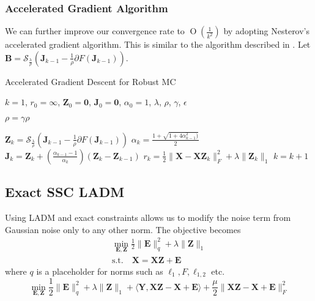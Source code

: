 \documentclass{article}
\newcommand{\BigO}[1]{\ensuremath{\operatorname{O}\left(#1\right)}}
\begin{document}
\subsubsection{Accelerated Gradient Algorithm}

We can further improve our convergence rate to $\BigO{\frac{1}{k^2}}$ by adopting Nesterov's accelerated gradient algorithm. This is similar to the algorithm described in \cite{ji2009accelerated}. Let $\mathbf B = \mathcal S_{\frac{\lambda}{\rho}}(\mathbf J_{k-1} - \frac1{\rho}\partial F(\mathbf J_{k-1}))$.

\begin{algorithm}
\caption{Accelerated Gradient Descent for Robust MC}
\begin{algorithmic}

\REQUIRE $k = 1$, $r_0 = \infty$, $\mathbf Z_0 = \mathbf 0$,  $\mathbf J_0 = \mathbf 0$, $\alpha_0 = 1$, $\lambda$, $\rho$, $\gamma$, $\epsilon$


	
		\STATE $\rho = \gamma \rho$	
	
	\ENDWHILE

	\STATE $\mathbf Z_k = \mathcal S_{\frac{\lambda}{\rho}}(\mathbf J_{k-1} - \frac1{\rho}\partial F(\mathbf J_{k-1}))$
	\STATE $\alpha_{k} = \frac{1 + \sqrt{1 + 4 \alpha_{k-1}^2)}}{2}$
	\STATE $\mathbf J_{k} = \mathbf Z_k + \left ( \frac{\alpha_{k-1} - 1}{\alpha_{k}} \right ) (\mathbf Z_k - \mathbf Z_{k-1})$
	\STATE $r_k = \frac12\|\mathbf X - \mathbf X\mathbf Z_k\|^2_F + \lambda\|\mathbf Z_k\|_{1}$
	\STATE $k = k + 1$
	
\ENDWHILE

\end{algorithmic}
\end{algorithm}


\subsection{Exact SSC LADM}

Using LADM and exact constraints allows us to modify the noise term from Gaussian noise only to any other norm. The objective becomes
\begin{align}
\min_{\mathbf{E, Z}} \frac12\|\mathbf E \|^2_q + \lambda\|\mathbf Z\|_{1} \\
\text{s.t.} \quad \mathbf{X = XZ + E} \nonumber
\end{align}
where $q$ is a placeholder for norms such as $\ell_1, F, \ell_{1,2}$ etc.
\[
\min_{\mathbf{E, Z}} \frac12\|\mathbf E \|^2_q + \lambda\|\mathbf Z\|_{1} + \langle \mathbf{Y, XZ - X + E } \rangle + \frac{\mu}{2} \|\mathbf{XZ - X + E } \|_F^2 
\]
\end{document}
